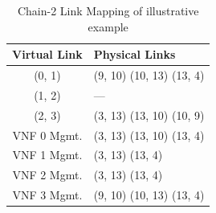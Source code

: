 \begin{table}
    \centering
    \caption{Chain-2 Link Mapping of illustrative example}
    \begin{tabular}{|c|l|}
        \hline
        Virtual Link & Physical Links \\
        \hline
        (0, 1) & (9, 10) (10, 13) (13, 4) \\
        \hline
        (1, 2) & --- \\
        \hline
        (2, 3) & (3, 13) (13, 10) (10, 9) \\
        \hline
        VNF 0 Mgmt. & (3, 13) (13, 10) (13, 4) \\
        \hline
        VNF 1 Mgmt. & (3, 13) (13, 4) \\
        \hline
        VNF 2 Mgmt. & (3, 13) (13, 4) \\
        \hline
        VNF 3 Mgmt. & (9, 10) (10, 13) (13, 4) \\
        \hline
    \end{tabular}
    \label{tbl:example-chain-2-links}
\end{table}
